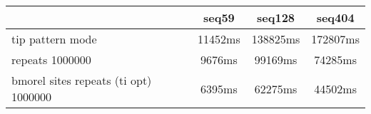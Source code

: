 \begin{tabular}{|l|c|c|c|}
\hline
 & seq59 & seq128 & seq404  \\
\hline
tip pattern mode &  11452ms &  138825ms &  172807ms\\
\hline
repeats 1000000 &  9676ms &  99169ms &  74285ms\\
\hline
bmorel sites repeats (ti opt) 1000000 &  6395ms &  62275ms &  44502ms\\
\hline
\end{tabular}
